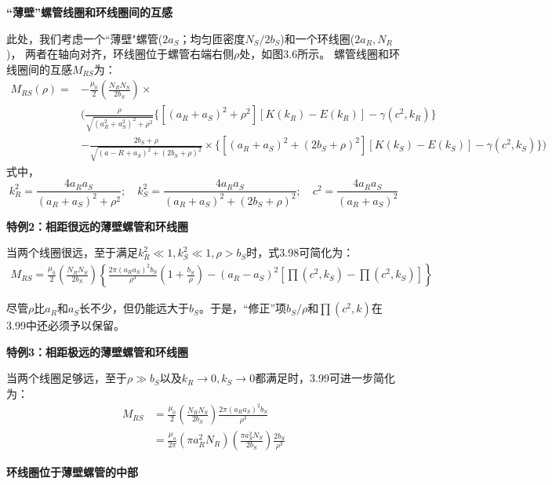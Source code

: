 \textbf{``薄壁''螺管线圈和环线圈间的互感} 

  此处，我们考虑一个``薄壁"螺管($2a_S$；均匀匝密度$N_S/2b_S$)和一个环线圈($2a_R,N_R$)，
  两者在轴向对齐，环线圈位于螺管右端右侧$\rho$处，如图3.6所示。
  螺管线圈和环线圈间的互感$M_{RS}$为：
  \begin{equation}
  \begin{split}
M_{RS}(\rho)=&-\frac{\mu_0}{2}\left(\frac{N_RN_S}{2b_S}\right)\times\\
&\bigg(\frac{\rho}{\sqrt{(a_R^2+a_S^2)^2+\rho^2}}\{[(a_R+a_S)^2+\rho^2][K(k_R)-E(k_R)]-\gamma(c^2,k_R)\}\\
&-\frac{2b_S+\rho}{\sqrt{(a-R+a_S)^2+(2b_S+\rho)^2}}\times
\{[(a_R+a_S)^2+(2b_S+\rho)^2][K(k_S)-E(k_S)]-\gamma(c^2,k_S)\}\bigg)%
  \end{split}
\end{equation}
式中，
\begin{equation*}
k_R^2=\frac{4a_Ra_S}{(a_R+a_S)^2+\rho^2};\quad k_S^2=\frac{4a_Ra_S}{(a_R+a_S)^2+(2b_S+\rho)^2};\quad c^2=\frac{4a_Ra_S}{(a_R+a_S)^2}%
\end{equation*}

\textbf{特例2：相距很远的薄壁螺管和环线圈} 

当两个线圈很远，至于满足$k_R^2 \ll 1, k_S^2\ll 1,\rho > b_S$时，式3.98可简化为：
\begin{align}
M_{RS} = \frac{\mu_0}{2} \left(\frac{N_RN_S}{2b_S}\right) 
\left\{\frac{2\pi(a_R a_S)^2 b_S}{\rho^3}\left(1+\frac{b_S}{\rho}\right)
-(a_R-a_S)^2[\prod(c^2,k_S)-\prod(c^2,k_S)]\right\}
\end{align}
  
尽管$\rho$比$a_R$和$a_S$长不少，但仍能远大于$b_S$。于是，``修正''项$b_S/\rho$和$\prod(c^2, k)$在3.99中还必须予以保留。

\textbf{特例3：相距极远的薄壁螺管和环线圈} 

  当两个线圈足够远，至于$\rho \gg b_S$以及$k_R\rightarrow 0,k_S\rightarrow 0$都满足时，3.99可进一步简化为：
 \begin{equation}
\begin{split}
M_{RS}&=\frac{\mu_0}{2}\left(\frac{N_RN_S}{2b_S}\right)\frac{2\pi(a_Ra_S)^2b_S}{\rho^3}\\
&=\frac{\mu_o}{2\pi}(\pi a_R^2N_R)\left(\frac{\pi a_S^2N_S}{2b_S}\right)\frac{2b_S}{\rho^3}%
\end{split}
\end{equation}

\textbf{环线圈位于薄壁螺管的中部} 

